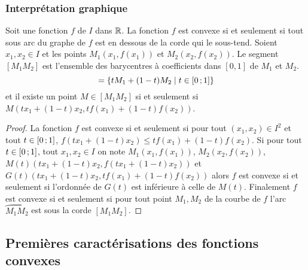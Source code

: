 \subsubsection{Interprétation graphique}

Soit une fonction \(f\) de \(I\) dans \(\mathbb{R}\). La fonction \(f\) est convexe si 
et seulement si tout sous arc du graphe de \(f\) est en dessous de la corde qui 
le sous-tend. Soient \(x_1, x_2 \in I\) et les points \(M_1(x_1,f(x_1))\) et 
\(M_2(x_2,f(x_2))\). Le segment \([M_1M_2]\) est l'ensemble des barycentres à 
coefficients dans \([0,1]\) de \(M_1\) et \(M_2\).
\begin{equation}
  [M_1M_2]=\enstq{tM_1 +(1-t)M_2}{t \in \intervalleff{0}{1}}
\end{equation}
et il existe un point \(M \in [M_1M_2]\) si et seulement si \(M(tx_1+(1-t)x_2, 
tf(x_1)+(1-t)f(x_2))\).

\begin{proof}
  La fonction \(f\) est convexe si et seulement si pour tout \((x_1,x_2) \in 
  I^2\) et tout \(t \in \left[ 0 \, ;  1 \right]\), \(f(tx_1+(1-t)x_2) \leqslant 
  tf(x_1)+(1-t)f(x_2)\). Si pour tout \(t \in \left[ 0 \, ;  1 \right]\), tout 
  \(x_1,x_2 \in I\) on note \(M_1(x_1,f(x_1))\), \(M_2(x_2,f(x_2))\), 
  \(M(t)(tx_1+(1-t)x_2,f(tx_1+(1-t)x_2))\) et 
  \(G(t)(tx_1+(1-t)x_2,tf(x_1)+(1-t)f(x_2))\) alors \(f\) est convexe si et 
  seulement si l'ordonnée de \(G(t)\) est inférieure à celle de \(M(t)\). 
  Finalement \(f\) est convexe si et seulement si pour tout point \(M_1, M_2\) 
  de la courbe de \(f\) l'arc \(\wideparen{M_1M_2}\) est sous la corde 
  \([M_1M_2]\).
\end{proof}

\subsection{Premières caractérisations des fonctions convexes}

